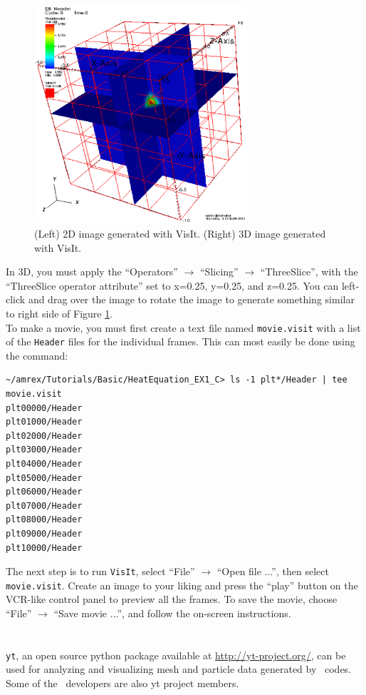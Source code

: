 \begin{enumerate}
\begin{figure}[tb]
\includegraphics[width=3.1in]{./Visualization/VisIt_3D}
\caption{(Left) 2D image generated with VisIt.  (Right) 3D image generated with VisIt.}
\label{Fig:VisIt}
\end{figure}

In 3D, you must apply the ``Operators'' $\rightarrow$ ``Slicing'' $\rightarrow$ ``ThreeSlice'', with the 
``ThreeSlice operator attribute'' set to x=0.25, y=0.25, and z=0.25.  You can left-click and drag
over the image to rotate the image to generate something similar to right side of Figure \ref{Fig:VisIt}.\\

To make a movie, you must first create a text file named {\tt movie.visit} with a list of the {\tt Header} 
files for the individual frames.  This can most easily be done using the command:
\begin{lstlisting}[backgroundcolor=\color{light-red}]
~/amrex/Tutorials/Basic/HeatEquation_EX1_C> ls -1 plt*/Header | tee movie.visit
plt00000/Header
plt01000/Header
plt02000/Header
plt03000/Header
plt04000/Header
plt05000/Header
plt06000/Header
plt07000/Header
plt08000/Header
plt09000/Header
plt10000/Header
\end{lstlisting}
The next step is to run {\tt VisIt}, select ``File'' $\rightarrow$ ``Open file ...'',
then select {\tt movie.visit}.  Create an image to your liking and press the ``play'' button
on the VCR-like control panel to preview all the frames.  To save the movie, choose
``File'' $\rightarrow$ ``Save movie ...'', and follow the on-screen instructions.

\section{\yt}

{\tt yt}, an open source python package available at
\url{http://yt-project.org/}, can be used for analyzing and
visualizing mesh and particle data generated by \amrex\ codes.  Some
of the \amrex\ developers are also yt project members.

\end{enumerate}
